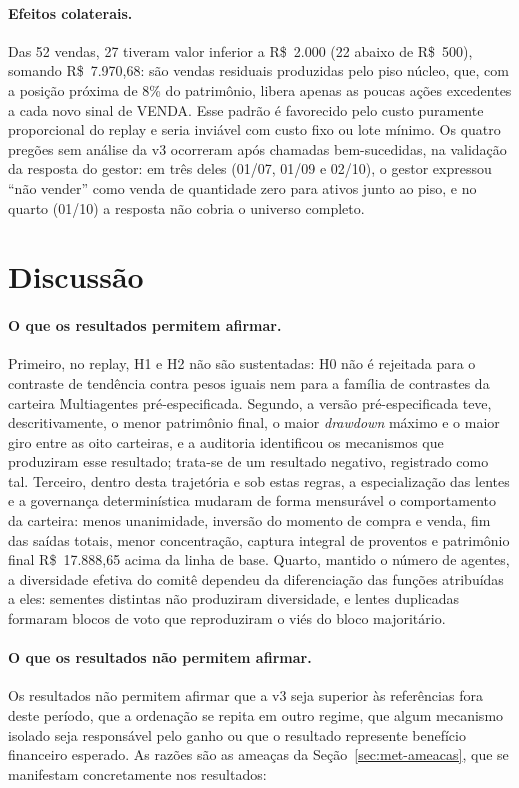 \paragraph*{Efeitos colaterais.} Das 52 vendas, 27 tiveram valor inferior a R\$~2.000 (22 abaixo de R\$~500), somando R\$~7.970,68: são vendas residuais produzidas pelo piso núcleo, que, com a posição próxima de 8\% do patrimônio, libera apenas as poucas ações excedentes a cada novo sinal de VENDA. Esse padrão é favorecido pelo custo puramente proporcional do replay e seria inviável com custo fixo ou lote mínimo. Os quatro pregões sem análise da v3 ocorreram após chamadas bem-sucedidas, na validação da resposta do gestor: em três deles (01/07, 01/09 e 02/10), o gestor expressou ``não vender'' como venda de quantidade zero para ativos junto ao piso, e no quarto (01/10) a resposta não cobria o universo completo.

\section{Discussão}
\label{sec:res-discussao}

\paragraph*{O que os resultados permitem afirmar.} Primeiro, no replay, H1 e H2 não são sustentadas: H0 não é rejeitada para o contraste de tendência contra pesos iguais nem para a família de contrastes da carteira Multiagentes pré-especificada. Segundo, a versão pré-especificada teve, descritivamente, o menor patrimônio final, o maior \textit{drawdown} máximo e o maior giro entre as oito carteiras, e a auditoria identificou os mecanismos que produziram esse resultado; trata-se de um resultado negativo, registrado como tal. Terceiro, dentro desta trajetória e sob estas regras, a especialização das lentes e a governança determinística mudaram de forma mensurável o comportamento da carteira: menos unanimidade, inversão do momento de compra e venda, fim das saídas totais, menor concentração, captura integral de proventos e patrimônio final R\$~17.888,65 acima da linha de base. Quarto, mantido o número de agentes, a diversidade efetiva do comitê dependeu da diferenciação das funções atribuídas a eles: sementes distintas não produziram diversidade, e lentes duplicadas formaram blocos de voto que reproduziram o viés do bloco majoritário.

\paragraph*{O que os resultados não permitem afirmar.} Os resultados não permitem afirmar que a v3 seja superior às referências fora deste período, que a ordenação se repita em outro regime, que algum mecanismo isolado seja responsável pelo ganho ou que o resultado represente benefício financeiro esperado. As razões são as ameaças da Seção~\ref{sec:met-ameacas}, que se manifestam concretamente nos resultados:

